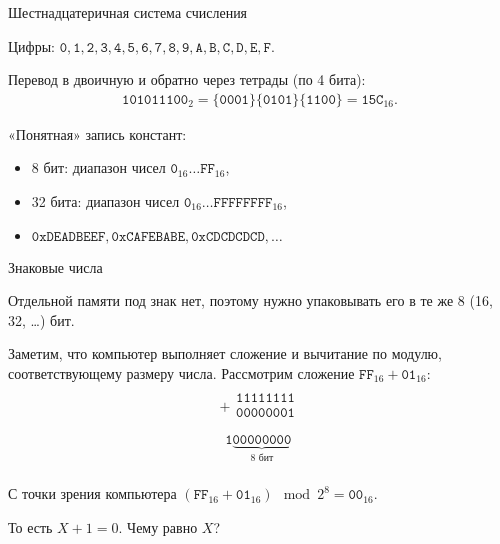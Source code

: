 \documentclass{beamer}
\newcommand{\pcnum}[1]{\ensuremath{\mathtt{#1}}}
\newcommand{\bin}[1]{\pcnum{#1}_2}
\newcommand{\hex}[1]{\pcnum{#1}_{16}}
\begin{document}
\begin{frame}{Шестнадцатеричная система счисления}

  Цифры: $\pcnum{0}, \pcnum{1}, \pcnum{2}, \pcnum{3}, \pcnum{4}, \pcnum{5},
  \pcnum{6}, \pcnum{7}, \pcnum{8}, \pcnum{9}, \pcnum{A}, \pcnum{B}, \pcnum{C},
  \pcnum{D}, \pcnum{E}, \pcnum{F}$.

  Перевод в двоичную и обратно через тетрады (по 4 бита):
  \begin{gather*}
    \bin{101011100} = \pcnum{\{0001\}\{0101\}\{1100\}} = \hex{15C}.
  \end{gather*}

  «Понятная» запись констант:
  \begin{itemize}
    \item 8 бит: диапазон чисел $\hex{0} \ldots \hex{FF}$,
    \item 32 бита: диапазон чисел $\hex{0} \ldots \hex{FFFFFFFF}$,
    \item $\texttt{0xDEADBEEF}, \texttt{0xCAFEBABE}, \texttt{0xCDCDCDCD},
      \ldots$
  \end{itemize}

\end{frame}

\begin{frame}{Знаковые числа}

  Отдельной памяти под знак нет, поэтому нужно упаковывать его в те же 8 (16,
  32, \ldots) бит.

  Заметим, что компьютер выполняет сложение и вычитание по модулю,
  соответствующему размеру числа. Рассмотрим сложение $\hex{FF} + \hex{01}$:
  \begin{gather*}
    \begin{array}{r}
    +
      \begin{array}{r}
        \pcnum{11111111} \\
        \pcnum{00000001} \\
      \end{array} \\
      \hline
      \begin{array}{r}
        \pcnum{1}\underbrace{\pcnum{00000000}}_{8 \text{ бит}}
      \end{array}
    \end{array}
  \end{gather*}

  С точки зрения компьютера $(\hex{FF} + \hex{01}) \mod 2^8 = \hex{00}$.

  То есть $X + 1 = 0$. Чему равно $X$?

\end{frame}

\end{document}
